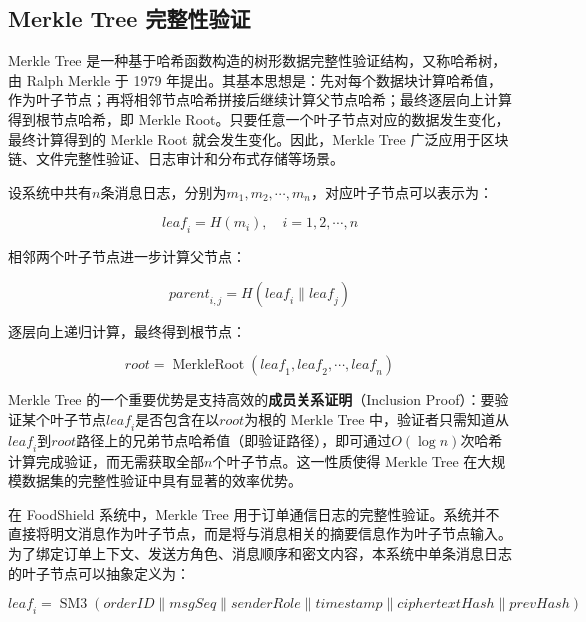 \subsection{Merkle Tree 完整性验证}

Merkle Tree 是一种基于哈希函数构造的树形数据完整性验证结构，又称哈希树，由 Ralph Merkle 于 1979 年提出\cite{merkle1989}。其基本思想是：先对每个数据块计算哈希值，作为叶子节点；再将相邻节点哈希拼接后继续计算父节点哈希；最终逐层向上计算得到根节点哈希，即 Merkle Root。只要任意一个叶子节点对应的数据发生变化，最终计算得到的 Merkle Root 就会发生变化。因此，Merkle Tree 广泛应用于区块链、文件完整性验证、日志审计和分布式存储等场景。

设系统中共有$n$条消息日志，分别为$m_1, m_2, \cdots, m_n$，对应叶子节点可以表示为：

\begin{equation}
\mathit{leaf}_i = H(m_i), \quad i = 1, 2, \cdots, n
\end{equation}

相邻两个叶子节点进一步计算父节点：

\begin{equation}
\mathit{parent}_{i,j} = H(\mathit{leaf}_i \parallel \mathit{leaf}_j)
\end{equation}

逐层向上递归计算，最终得到根节点：

\begin{equation}
\mathit{root} = \operatorname{MerkleRoot}(\mathit{leaf}_1, \mathit{leaf}_2, \cdots, \mathit{leaf}_n)
\end{equation}



Merkle Tree 的一个重要优势是支持高效的\textbf{成员关系证明}（Inclusion Proof）：要验证某个叶子节点$\mathit{leaf}_i$是否包含在以$\mathit{root}$为根的 Merkle Tree 中，验证者只需知道从$\mathit{leaf}_i$到$\mathit{root}$路径上的兄弟节点哈希值（即验证路径），即可通过$O(\log n)$次哈希计算完成验证，而无需获取全部$n$个叶子节点。这一性质使得 Merkle Tree 在大规模数据集的完整性验证中具有显著的效率优势。

在 FoodShield 系统中，Merkle Tree 用于订单通信日志的完整性验证。系统并不直接将明文消息作为叶子节点，而是将与消息相关的摘要信息作为叶子节点输入。为了绑定订单上下文、发送方角色、消息顺序和密文内容，本系统中单条消息日志的叶子节点可以抽象定义为：

\begin{equation}
\mathit{leaf}_i = \operatorname{SM3}(\mathit{orderID} \parallel \mathit{msgSeq} \parallel \mathit{senderRole} \parallel \mathit{timestamp} \parallel \mathit{ciphertextHash} \parallel \mathit{prevHash})
\end{equation}

